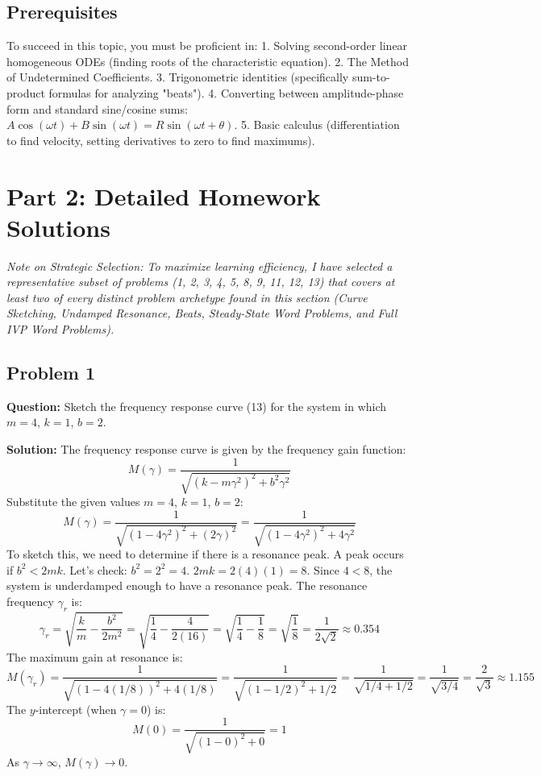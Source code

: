 \documentclass[11pt]{article}
\begin{document}
\subsection{Prerequisites}
To succeed in this topic, you must be proficient in:
1. Solving second-order linear homogeneous ODEs (finding roots of the characteristic equation).
2. The Method of Undetermined Coefficients.
3. Trigonometric identities (specifically sum-to-product formulas for analyzing "beats").
4. Converting between amplitude-phase form and standard sine/cosine sums: $A \cos(\omega t) + B \sin(\omega t) = R \sin(\omega t + \theta)$.
5. Basic calculus (differentiation to find velocity, setting derivatives to zero to find maximums).

\newpage
\section{Part 2: Detailed Homework Solutions}
\textit{Note on Strategic Selection: To maximize learning efficiency, I have selected a representative subset of problems (1, 2, 3, 4, 5, 8, 9, 11, 12, 13) that covers at least two of every distinct problem archetype found in this section (Curve Sketching, Undamped Resonance, Beats, Steady-State Word Problems, and Full IVP Word Problems).}

\subsection{Problem 1}
\textbf{Question:} Sketch the frequency response curve (13) for the system in which $m = 4$, $k = 1$, $b = 2$.

\textbf{Solution:}
The frequency response curve is given by the frequency gain function:
\[ M(\gamma) = \frac{1}{\sqrt{(k-m\gamma^2)^2 + b^2\gamma^2}} \]
Substitute the given values $m=4$, $k=1$, $b=2$:
\[ M(\gamma) = \frac{1}{\sqrt{(1-4\gamma^2)^2 + (2\gamma)^2}} = \frac{1}{\sqrt{(1-4\gamma^2)^2 + 4\gamma^2}} \]
To sketch this, we need to determine if there is a resonance peak. A peak occurs if $b^2 < 2mk$.
Let's check: $b^2 = 2^2 = 4$. $2mk = 2(4)(1) = 8$.
Since $4 < 8$, the system is underdamped enough to have a resonance peak.
The resonance frequency $\gamma_r$ is:
\[ \gamma_r = \sqrt{\frac{k}{m} - \frac{b^2}{2m^2}} = \sqrt{\frac{1}{4} - \frac{4}{2(16)}} = \sqrt{\frac{1}{4} - \frac{1}{8}} = \sqrt{\frac{1}{8}} = \frac{1}{2\sqrt{2}} \approx 0.354 \]
The maximum gain at resonance is:
\[ M(\gamma_r) = \frac{1}{\sqrt{(1-4(1/8))^2 + 4(1/8)}} = \frac{1}{\sqrt{(1-1/2)^2 + 1/2}} = \frac{1}{\sqrt{1/4 + 1/2}} = \frac{1}{\sqrt{3/4}} = \frac{2}{\sqrt{3}} \approx 1.155 \]
The $y$-intercept (when $\gamma = 0$) is:
\[ M(0) = \frac{1}{\sqrt{(1-0)^2 + 0}} = 1 \]
As $\gamma \to \infty$, $M(\gamma) \to 0$.
\end{document}
